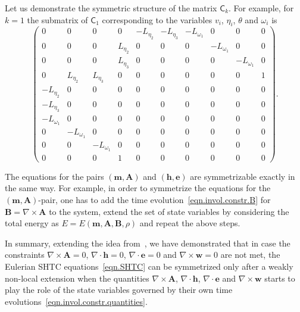 \documentclass[twoside]{article}
\newcommand{\AAA}{{\boldsymbol{A}}}
\newcommand{\ww}{{\boldsymbol{w}}}
\newcommand{\mm}{{\boldsymbol{m}}}
\newcommand{\ee}{{\boldsymbol{e}}}
\newcommand{\hh}{{\boldsymbol{h}}}
\newcommand{\BB}{{\boldsymbol{B}}}
\newcommand{\IP}[1]{ \textcolor{blue}   {\small\texttt{
\texttt{[image: pin\_small.jpeg]} Ilya: #1}} }
\begin{document}
Let us demonstrate the symmetric structure of the matrix 
$ \mathsf{C}_k $. For example, for $ k=1 $ the submatrix of $ \mathsf{C}_1 $ 
corresponding to the variables $ v_i $, $ \eta_i $, $ \theta $ and $ \omega_i $ 
is 
\begin{equation}
\left(
\begin{array}{cccccccccc}
0 & 0 & 0 & 0 & -L_{\eta _2} & -L_{\eta _3} & -L_{\omega _1} & 0 & 0 & 0 \\
0 & 0 & 0 & L_{\eta _2} & 0 & 0 & 0 & -L_{\omega _1} & 0 & 0\\
0 & 0 & 0 & L_{\eta _3} & 0 & 0 & 0 & 0 & -L_{\omega _1} & 0\\
 0 & L_{\eta _2} & L_{\eta _3} & 0 & 0 & 0 & 0 & 0 & 0 & 1 \\
 -L_{\eta _2} & 0 & 0 & 0 & 0 & 0 & 0 & 0 & 0 & 0 \\
 -L_{\eta _3} & 0 & 0 & 0 & 0 & 0 & 0 & 0 & 0 & 0 \\
 -L_{\omega _1} & 0 & 0 & 0 & 0 & 0 & 0 & 0 & 0 & 0 \\
 0 & -L_{\omega _1} & 0 & 0 & 0 & 0 & 0 & 0 & 0 & 0 \\
 0 & 0 & -L_{\omega _1} & 0 & 0 & 0 & 0 & 0 & 0 & 0 \\
0 & 0 & 0 & 1 & 0 & 0 & 0 & 0 & 0 & 0
\end{array}
\right).
\end{equation}

The equations for the pairs $ (\mm,\AAA) $ and $ (\hh,\ee) $ are symmetrizable 
exactly in the same way. For example, in order to symmetrize the equations for 
the $ (\mm,\AAA) $-pair, one has to add the time 
evolution~\eqref{eqn.invol.constr.B} for $ \BB=\nabla\times\AAA $ to the 
system, extend the set of state variables by considering the total energy as $ 
E = 
E(\mm,\AAA,\BB,\rho) $ and repeat the above steps. 




In summary, extending the idea from~\cite{Romenski2002}, we have demonstrated 
that in case the constraints $ \nabla\times\AAA = 0 $, $ \nabla\cdot\hh = 0 $, 
$ \nabla\cdot\ee = 0 $ and $ \nabla\times\ww = 0 $ are not met, the Eulerian 
SHTC equations~\eqref{eqn.SHTC} can be symmetrized only after a weakly 
non-local 
extension when the quantities $ \nabla\times\AAA $, $ \nabla\cdot\hh $, $ 
\nabla\cdot\ee $ and $ \nabla\times\ww $ starts to play the role of the state 
variables governed by their own time 
evolutions~\eqref{eqn.invol.constr.quantities}.
\end{document}
